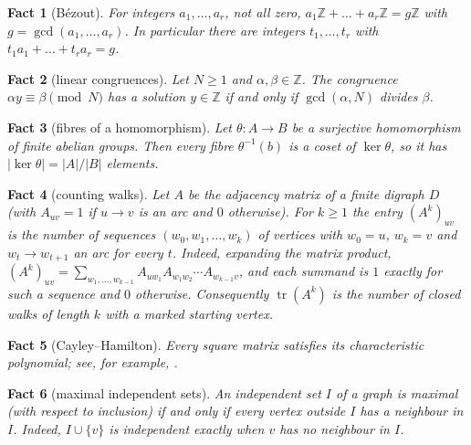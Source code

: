 \documentclass[11pt]{article}
\theoremstyle{plain}
\newtheorem{fact}[fact]{Fact}
\theoremstyle{definition}
\theoremstyle{remark}
\newcommand{\Z}{\mathbb{Z}}
\DeclareMathOperator{\tr}{tr}
\begin{document}
\begin{fact}[B\'ezout]\label{fact:bezout}
For integers $a_1, \dots, a_r$, not all zero, $a_1\Z + \dots + a_r\Z = g\Z$ with
$g = \gcd(a_1, \dots, a_r)$. In particular there are integers $t_1, \dots, t_r$ with
$t_1 a_1 + \dots + t_r a_r = g$.
\end{fact}

\begin{fact}[linear congruences]\label{fact:congruence}
Let $N \ge 1$ and $\alpha, \beta \in \Z$. The congruence $\alpha y \equiv \beta \pmod N$ has a
solution $y \in \Z$ if and only if $\gcd(\alpha, N)$ divides $\beta$.
\end{fact}

\begin{fact}[fibres of a homomorphism]\label{fact:fibres}
Let $\theta : A \to B$ be a surjective homomorphism of finite abelian groups. Then every fibre
$\theta^{-1}(b)$ is a coset of $\ker\theta$, so it has $|\ker\theta| = |A|/|B|$ elements.
\end{fact}

\begin{fact}[counting walks]\label{fact:walks}
Let $A$ be the adjacency matrix of a finite digraph $D$ (with $A_{uv} = 1$ if $u \to v$ is an
arc and $0$ otherwise). For $k \ge 1$ the entry $(A^k)_{uv}$ is the number of sequences
$(w_0, w_1, \dots, w_k)$ of vertices with $w_0 = u$, $w_k = v$ and $w_{t} \to w_{t+1}$ an arc
for every $t$. Indeed, expanding the matrix product,
$(A^k)_{uv} = \sum_{w_1, \dots, w_{k-1}} A_{u w_1} A_{w_1 w_2} \cdots A_{w_{k-1} v}$, and each
summand is $1$ exactly for such a sequence and $0$ otherwise. Consequently $\tr(A^k)$ is the
number of closed walks of length $k$ with a marked starting vertex.
\end{fact}

\begin{fact}[Cayley--Hamilton]\label{fact:ch}
Every square matrix satisfies its characteristic polynomial; see, for example,
\cite{HJ2013}.
\end{fact}

\begin{fact}[maximal independent sets]\label{fact:mis}
An independent set $I$ of a graph is maximal (with respect to inclusion) if and only if every
vertex outside $I$ has a neighbour in $I$. Indeed, $I \cup \{v\}$ is independent exactly when
$v$ has no neighbour in $I$.
\end{fact}

\end{document}

